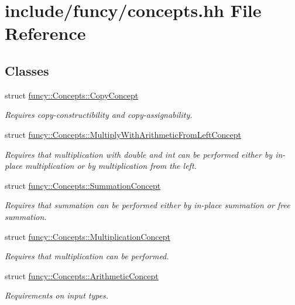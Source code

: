 \hypertarget{concepts_8hh}{\section{include/funcy/concepts.hh File Reference}
\label{concepts_8hh}
}
\subsection*{Classes}
\begin{DoxyCompactItemize}
\item 
struct \hyperlink{structfuncy_1_1Concepts_1_1CopyConcept}{funcy\-::\-Concepts\-::\-Copy\-Concept}
\begin{DoxyCompactList}\small\item\em Requires copy-\/constructibility and copy-\/assignability. \end{DoxyCompactList}\item 
struct \hyperlink{structfuncy_1_1Concepts_1_1MultiplyWithArithmeticFromLeftConcept}{funcy\-::\-Concepts\-::\-Multiply\-With\-Arithmetic\-From\-Left\-Concept}
\begin{DoxyCompactList}\small\item\em Requires that multiplication with double and int can be performed either by in-\/place multiplication or by multiplication from the left. \end{DoxyCompactList}\item 
struct \hyperlink{structfuncy_1_1Concepts_1_1SummationConcept}{funcy\-::\-Concepts\-::\-Summation\-Concept}
\begin{DoxyCompactList}\small\item\em Requires that summation can be performed either by in-\/place summation or free summation. \end{DoxyCompactList}\item 
struct \hyperlink{structfuncy_1_1Concepts_1_1MultiplicationConcept}{funcy\-::\-Concepts\-::\-Multiplication\-Concept}
\begin{DoxyCompactList}\small\item\em Requires that multiplication can be performed. \end{DoxyCompactList}\item 
struct \hyperlink{structfuncy_1_1Concepts_1_1ArithmeticConcept}{funcy\-::\-Concepts\-::\-Arithmetic\-Concept}
\begin{DoxyCompactList}\small\item\em Requirements on input types. \end{DoxyCompactList}\item 

\end{DoxyCompactItemize}
